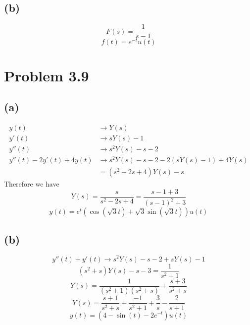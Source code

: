 \documentclass[12pt]{article}
\begin{document}
\subsection*{(b)}
$$F(s)=\frac{1}{s-1}$$
$$f(t)=e^{-t}u(t)$$
\section*{Problem 3.9}
\subsection*{(a)}
\begin{align*}
y(t)&\to Y(s)\\
y'(t)&\to sY(s)-1\\
y''(t)&\to s^2Y(s)-s-2\\
y''(t)-2y'(t)+4y(t)&\to s^2Y(s)-s-2-2(sY(s)-1)+4Y(s)\\
&=(s^2-2s+4)Y(s)-s
\end{align*}
Therefore we have
$$Y(s)=\frac{s}{s^2-2s+4}=\frac{s-1+3}{(s-1)^2+3}$$
$$y(t)=e^t (\cos(\sqrt{3}t)+\sqrt{3}\sin(\sqrt{3}t))u(t)$$

\subsection*{(b)}
$$y''(t)+y'(t)\to s^2Y(s)-s-2+sY(s)-1$$
$$(s^2+s)Y(s)-s-3=\frac{1}{s^2+1}$$
$$Y(s)=\frac{1}{(s^2+1)(s^2+s)}+\frac{s+3}{s^2+s}$$
$$Y(s)=\frac{s+1}{s^2+s}+\frac{-1}{s^2+1}+\frac{3}{s}-\frac{2}{s+1}$$
$$y(t)=\boxed{(4-\sin(t)-2e^{-t})u(t)}$$
\end{document}
